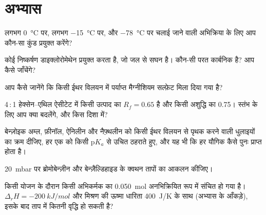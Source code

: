 \section{अभ्यास}

\begin{exercise}[$\star$]\label{exo:b2:lab-techniques-2:1}
लगभग \qty{0}{\degreeCelsius} पर, लगभग
\qty{-15}{\degreeCelsius} पर, और \qty{-78}{\degreeCelsius} पर चलाई जाने वाली अभिक्रिया के लिए आप कौन-सा कुंड प्रयुक्त करेंगे?
\end{exercise}

\begin{exercise}[$\star$]\label{exo:b2:lab-techniques-2:2}
कोई निष्कर्षण डाइक्लोरोमेथेन प्रयुक्त करता है, जो जल से सघन है। कौन-सी परत कार्बनिक है? आप कैसे जाँचेंगे?
\end{exercise}

\begin{exercise}[$\star$]\label{exo:b2:lab-techniques-2:3}
आप कैसे जानेंगे कि किसी ईथर विलयन में पर्याप्त मैग्नीशियम सल्फ़ेट मिला दिया गया है?
\end{exercise}

\begin{exercise}[$\star$]\label{exo:b2:lab-techniques-2:4}
4\,:\,1 हेक्सेन--एथिल ऐसीटेट में किसी उत्पाद का $R_f = 0.65$ है और किसी अशुद्धि का 0.75। स्तंभ के लिए आप क्या
बदलेंगे, और किस दिशा में?
\end{exercise}

\begin{exercise}[$\star\star$]\label{exo:b2:lab-techniques-2:5}
बेन्ज़ोइक अम्ल, फ़ीनॉल, ऐनिलीन और नैफ़्थलीन को किसी ईथर विलयन से पृथक करने वाली धुलाइयों का क्रम दीजिए,
हर एक को किसी $\mathrm pK_a$ से उचित ठहराते हुए, और यह भी कि हर यौगिक कैसे पुनः प्राप्त होता है।
\end{exercise}

\begin{exercise}[$\star\star$]\label{exo:b2:lab-techniques-2:6}
\qty{20}{mbar} पर ब्रोमोबेन्ज़ीन और बेन्ज़ैल्डिहाइड के क्वथन तापों का आकलन कीजिए।
\end{exercise}

\begin{exercise}[$\star\star$]\label{exo:b2:lab-techniques-2:7}
किसी योजन के दौरान किसी अभिकर्मक का \qty{0.050}{mol} अनभिक्रियित रूप में संचित हो गया है। $\Delta_rH =
\qty{-200}{kJ/mol}$ और मिश्रण की ऊष्मा धारिता \qty{400}{J/K} के साथ (अभ्यास के आँकड़े), इसके बाद
ताप में कितनी वृद्धि हो सकती है?
\end{exercise}

